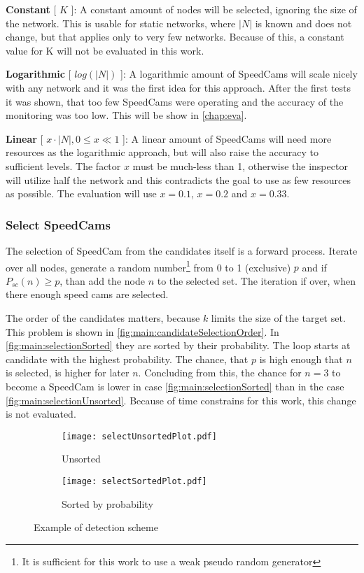 \documentclass[thesis.tex]{subfiles}
\begin{document}
\textbf{Constant} [ $K$ ]: A constant amount of nodes will be selected, ignoring the size of the network. This is usable for static networks, where $|N|$ is known and does not change, but that applies only to very few networks. Because of this, a constant value for K will not be evaluated in this work.

\textbf{Logarithmic} [ $log(|N|)$ ]: A logarithmic amount of SpeedCams will scale nicely with any network and it was the first idea for this approach. After the first tests it was shown, that too few SpeedCams were operating and the accuracy of the monitoring was too low. This will be show in \autoref{chap:eva}.

\textbf{Linear} [ $x\cdot |N|, 0 \leq x\ll1$ ]: A linear amount of SpeedCams will need more resources as the logarithmic approach, but will also raise the accuracy to sufficient levels. The factor $x$ must be much-less than 1, otherwise the inspector will utilize half the network and this contradicts the goal to use as few resources as possible. The evaluation will use $x=0.1$, $x=0.2$ and $x=0.33$.

\newpage
\subsubsection{Select SpeedCams}

The selection of SpeedCam from the candidates itself is a forward process. Iterate over all nodes, generate a random number\footnote{It is sufficient for this work to use a weak pseudo random generator} from 0 to 1 (exclusive) $p$ and if $P_{sc}(n) \geq p$, than add the node $n$ to the selected set. The iteration if over, when there enough speed cams are selected.

The order of the candidates matters, because $k$ limits the size of the target set. This problem is shown in \autoref{fig:main:candidateSelectionOrder}. In \autoref{fig:main:selectionSorted} they are sorted by their probability. The loop starts at candidate with the highest probability. The chance, that $p$ is high enough that $n$ is selected, is higher for later $n$. Concluding from this, the chance for $n=3$ to become a SpeedCam is lower in case \autoref{fig:main:selectionSorted} than in the case \autoref{fig:main:selectionUnsorted}. Because of time constrains for this work, this change is not evaluated. 
\begin{figure}[h]
    \begin{subfigure}{.45\linewidth}
        \centering
        \texttt{[image: selectUnsortedPlot.pdf]}
        \caption{Unsorted}
        \label{fig:main:selectionUnsorted}
    \end{subfigure}%
    \begin{subfigure}{0.45\linewidth}
        \centering
        \texttt{[image: selectSortedPlot.pdf]}
        \caption{Sorted by probability}
        \label{fig:main:selectionSorted}
    \end{subfigure}
    \caption{Example of detection scheme}
    \label{fig:main:candidateSelectionOrder}
\end{figure}
\end{document}
